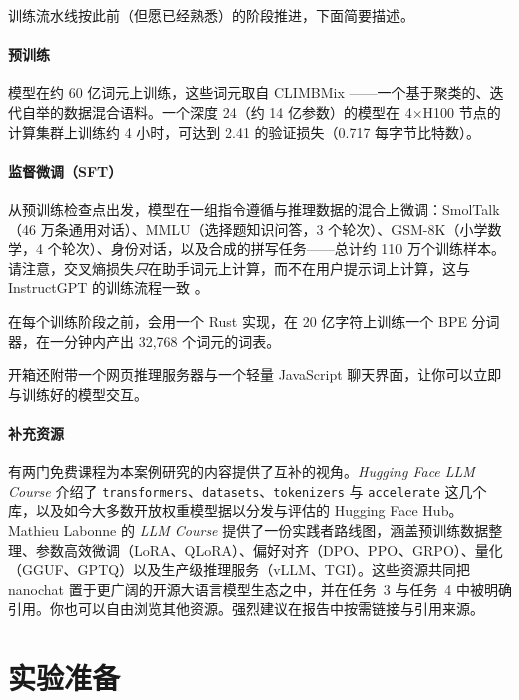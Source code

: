 训练流水线按此前（但愿已经熟悉）的阶段推进，下面简要描述。

\paragraph{预训练}  模型在约 60 亿词元上训练，这些词元取自 CLIMBMix \citep{diao2026nemotron}——一个基于聚类的、迭代自举的数据混合语料。一个深度 24（约 14 亿参数）的模型在 4$\times$H100 节点的计算集群上训练约 4 小时，可达到 2.41 的验证损失（0.717 每字节比特数）。

\paragraph{监督微调（SFT）}  从预训练检查点出发，模型在一组指令遵循与推理数据的混合上微调：SmolTalk \citep{benallal2024smoltalk}（46 万条通用对话）、MMLU（选择题知识问答，3 个轮次）、GSM-8K（小学数学，4 个轮次）、身份对话，以及合成的拼写任务——总计约 110 万个训练样本。请注意，交叉熵损失\emph{只}在助手词元上计算，而不在用户提示词上计算，这与 InstructGPT 的训练流程一致 \citep{ouyang2022training}。

在每个训练阶段之前，会用一个 Rust 实现，在 20 亿字符上训练一个 BPE 分词器，在一分钟内产出 32{,}768 个词元的词表。

开箱还附带一个网页推理服务器与一个轻量 JavaScript 聊天界面，让你可以立即与训练好的模型交互。

\paragraph{补充资源}  有两门免费课程为本案例研究的内容提供了互补的视角。\textit{Hugging Face LLM Course} \citep{huggingface2022course} 介绍了 \texttt{transformers}、\texttt{datasets}、\texttt{tokenizers} 与 \texttt{accelerate} 这几个库，以及如今大多数开放权重模型据以分发与评估的 Hugging Face Hub。Mathieu Labonne 的 \textit{LLM Course} \citep{labonne2023llmcourse} 提供了一份实践者路线图，涵盖预训练数据整理、参数高效微调（LoRA、QLoRA）、偏好对齐（DPO、PPO、GRPO）、量化（GGUF、GPTQ）以及生产级推理服务（vLLM、TGI）。这些资源共同把 nanochat 置于更广阔的开源大语言模型生态之中，并在任务~3 与任务~4 中被明确引用。你也可以自由浏览其他资源。强烈建议在报告中按需链接与引用来源。

\section{实验准备}
\label{sec:preparation}

